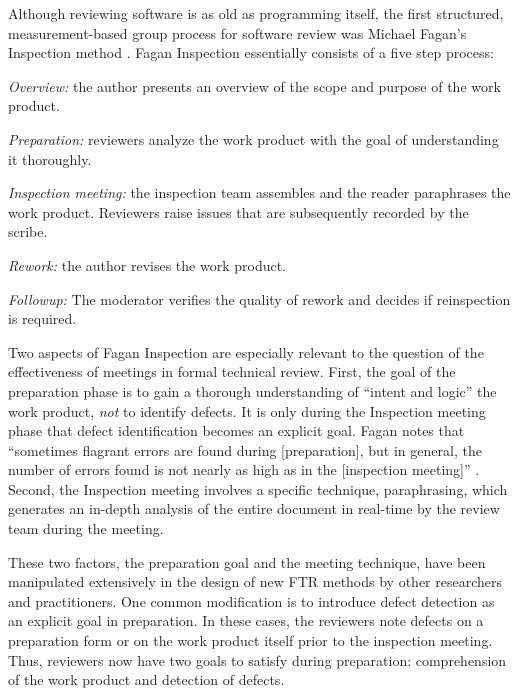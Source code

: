 Although reviewing software is as old as programming itself, the first
structured, measurement-based group process for software review was
Michael Fagan's Inspection method \cite{Fagan76}. Fagan
Inspection essentially consists of a five step process:

\begin{smallitem}
\item {\em Overview:} the author presents an overview of the scope and
purpose of the work product.

\item {\em Preparation:} reviewers analyze the work product with the goal
of understanding it thoroughly. 

\item {\em Inspection meeting:} the inspection team assembles and the 
reader paraphrases the work product. Reviewers raise issues that are 
subsequently recorded by the scribe. 

\item {\em Rework:} the author revises the work product. 

\item {\em Followup:} The moderator verifies the quality of rework and 
decides if reinspection is required. 

\end{smallitem}

Two aspects of Fagan Inspection are especially relevant to the question of
the effectiveness of meetings in formal technical review. First, the goal
of the preparation phase is to gain a thorough understanding of ``intent
and logic'' the work product, {\em not} to identify defects. It is only
during the Inspection meeting phase that defect identification becomes an
explicit goal.  Fagan notes that ``sometimes flagrant errors are found
during [preparation], but in general, the number of errors found is not
nearly as high as in the [inspection meeting]'' \cite{Fagan76}.  Second,
the Inspection meeting involves a specific technique, paraphrasing, which
generates an in-depth analysis of the entire document in real-time by the
review team during the meeting.

These two factors, the preparation goal and the meeting technique, have
been manipulated extensively in the design of new FTR methods by other
researchers and practitioners.  One common modification is to introduce
defect detection as an explicit goal in preparation. In these cases, the
reviewers note defects on a preparation form or on the work product itself
prior to the inspection meeting. Thus, reviewers now have two goals to
satisfy during preparation: comprehension of the work product and detection
of defects.


